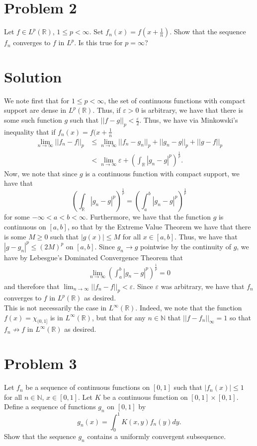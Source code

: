 \documentclass{article}
\begin{document}
\section*{Problem 2}
Let $f\in L^p(\mathbb{R})$, $1\leq p<\infty$.  Set $f_n(x)=f(x+\frac{1}{n})$.  Show that the sequence $f_n$ converges to $f$ in $L^p$.  Is this true for $p=\infty$?

\section*{Solution}
We note first that for $1\leq p<\infty$, the set of continuous functions with compact support are dense in $L^p(\mathbb{R})$.  Thus, if $\varepsilon>0$ is arbitrary, we have that there is some such function $g$ such that $||f-g||_p<\frac{\varepsilon}{2}$.  Thus, we have via Minkowski's inequality that if $f_n(x)=f(x+\frac{1}{n}$
\begin{align*}
\lim_{n\rightarrow\infty}||f_n-f||_p&\leq\lim_{n\rightarrow\infty}||f_n-g_n||_p+||g_n-g||_p+||g-f||_p\\
&<\lim_{n\rightarrow\infty}\varepsilon+\left(\int_\mathbb{R}|g_n-g|^p\right)^{\frac{1}{p}}.
\end{align*}
Now, we note that since $g$ is a continuous function with compact support, we have that $$\left(\int_\mathbb{R}|g_n-g|^p\right)^{\frac{1}{p}}=\left(\int_a^b|g_n-g|^p\right)^{\frac{1}{p}}$$ for some $-\infty<a<b<\infty$.  Furthermore, we have that the function $g$ is continuous on $[a,b]$, so that by the Extreme Value Theorem we have that there is some $M\geq0$ such that $|g(x)|\leq M$ for all $x\in[a,b]$.  Thus, we have that $|g-g_n|^p\leq(2M)^p$ on $[a,b]$.  Since $g_n\rightarrow g$ pointwise by the continuity of $g$, we have by Lebesgue's Dominated Convergence Theorem that
\begin{align*}
\lim_{n\rightarrow\infty}\left(\int_a^b|g_n-g|^p\right)^{\frac{1}{p}}=0
\end{align*}
and therefore that $\lim_{n\rightarrow\infty}||f_n-f||_p<\varepsilon$.  Since $\varepsilon$ was arbitrary, we have that $f_n$ converges to $f$ in $L^p(\mathbb{R})$ as desired.\\

\noindent This is not necessarily the case in $L^\infty(\mathbb{R})$.  Indeed, we note that the function $f(x)=\chi_{(0,1]}$ is in $L^\infty(\mathbb{R})$, but that for any $n\in\mathbb{N}$ that $||f-f_n||_\infty=1$ so that $f_n\not\rightarrow f$ in $L^\infty(\mathbb{R})$ as desired.

\section*{Problem 3}
Let $f_n$ be a sequence of continuous functions on $[0,1]$ such that $|f_n(x)|\leq 1$ for all $n\in\mathbb{N}$, $x\in[0,1]$.  Let $K$ be a continuous function on $[0,1]\times[0,1]$.  Define a sequence of functions $g_n$ on $[0,1]$ by $$g_n(x)=\int_0^1K(x,y)f_n(y)dy.$$ Show that the sequence $g_n$ contains a uniformly convergent subsequence.\\
\end{document}
